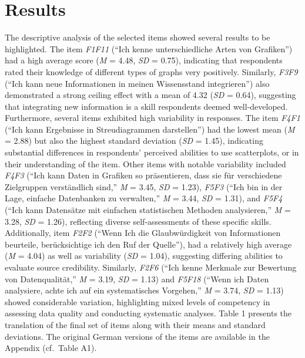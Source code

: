 \documentclass[
  12pt,
  a4paper,
  twoside]{article}
\begin{document}
\section{Results}\label{results}

The descriptive analysis of the selected items showed several results to be highlighted. The item \emph{F1F11} (``Ich kenne unterschiedliche Arten von Grafiken'') had a high average score (\emph{M} = 4.48, \emph{SD} = 0.75), indicating that respondents rated their knowledge of different types of graphs very positively. Similarly, \emph{F3F9} (``Ich kann neue Informationen in meinen Wissensstand integrieren'') also demonstrated a strong ceiling effect with a mean of 4.32 (\emph{SD} = 0.64), suggesting that integrating new information is a skill respondents deemed well-developed.
Furthermore, several items exhibited high variability in responses. The item \emph{F4F1} (``Ich kann Ergebnisse in Streudiagrammen darstellen'') had the lowest mean (\emph{M} = 2.88) but also the highest standard deviation (\emph{SD} = 1.45), indicating substantial differences in respondents' perceived abilities to use scatterplots, or in their understanding of the item. Other items with notable variability included \emph{F4F3} (``Ich kann Daten in Grafiken so präsentieren, dass sie für verschiedene Zielgruppen verständlich sind,'' \emph{M} = 3.45, \emph{SD} = 1.23), \emph{F5F3} (``Ich bin in der Lage, einfache Datenbanken zu verwalten,'' \emph{M} = 3.44, \emph{SD} = 1.31), and \emph{F5F4} (``Ich kann Datensätze mit einfachen statistischen Methoden analysieren,'' \emph{M} = 3.28, \emph{SD} = 1.26), reflecting diverse self-assessments of these specific skills.
Additionally, item \emph{F2F2} (``Wenn Ich die Glaubwürdigkeit von Informationen beurteile, berücksichtige ich den Ruf der Quelle''), had a relatively high average (\emph{M} = 4.04) as well as variability (\emph{SD} = 1.04), suggesting differing abilities to evaluate source credibility. Similarly, \emph{F2F6} (``Ich kenne Merkmale zur Bewertung von Datenqualität,'' \emph{M} = 3.19, \emph{SD} = 1.13) and \emph{F5F18} (``Wenn ich Daten analysiere, achte ich auf ein systematisches Vorgehen,'' \emph{M} = 3.74, \emph{SD} = 1.13) showed considerable variation, highlighting mixed levels of competency in assessing data quality and conducting systematic analyses. Table 1 presents the translation of the final set of items along with their means and standard deviations. The original German versions of the items are available in the Appendix (cf.~Table A1).
\end{document}

